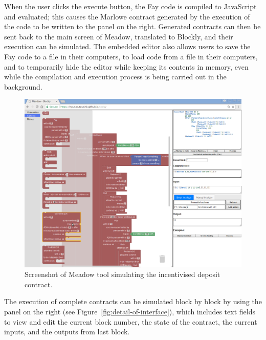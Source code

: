 \documentclass[runningheads]{llncs}
\begin{document}
When the user clicks the execute button, the Fay code is 
compiled to JavaScript and evaluated; this causes the Marlowe contract generated by the execution of the code to be 
written to the panel on the right. Generated contracts can then be sent back to the main screen of Meadow, translated 
to Blockly, and their execution can be simulated. The embedded editor also allows users to save the Fay code to a 
file in their computers, to load code from a file in their computers, and to temporarily hide the editor while keeping 
its contents in memory, even while the compilation and execution process is being carried out in the background.

\begin{figure}[t]
\begin{centering}
\includegraphics[width=1.1\textwidth]{pix/screenshot1}
\par\end{centering}
\caption{\label{fig:full-screenshot-demo}Screenshot of Meadow tool
simulating the incentivised deposit contract.}
\vspace*{-8mm}
\end{figure}


The execution of complete contracts can be simulated block by block
by using the panel on the right (see Figure~\ref{fig:detail-of-interface}),
which includes text fields to view and edit the current block number,
the state of the contract, the current inputs, and the outputs from
last block.
\end{document}

